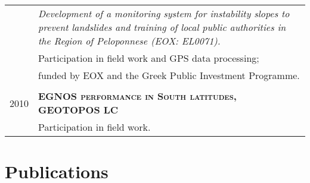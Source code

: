 \documentclass[9pt]{extarticle} %
\begin{document}
\begin{longtable}{r|p{13cm}}
  & \textit{Development of a monitoring system for instability slopes to prevent landslides and training of local public authorities in the Region of Peloponnese (EOX: EL0071).}\\
  & Participation in field work and GPS data processing;\\
  & funded by EOX and the Greek Public Investment Programme.\\
%
\multicolumn{2}{c}{}\\
\textsc{2010} & \textbf{\textsc{EGNOS performance in South latitudes, GEOTOPOS LC}}\\
  & Participation in field work.\\
%
\end{longtable}
\medskip

\section{Publications}
\medskip
%
\end{document}
